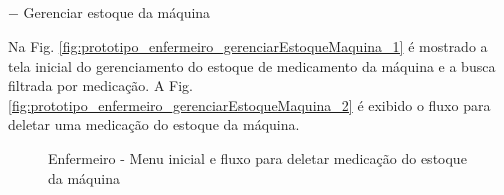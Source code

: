 \subparagraph*{} $-$ Gerenciar estoque da máquina

Na Fig. \ref{fig:prototipo_enfermeiro_gerenciarEstoqueMaquina_1} é mostrado a tela inicial do gerenciamento do estoque de medicamento da máquina e a busca filtrada por medicação. A Fig. \ref{fig:prototipo_enfermeiro_gerenciarEstoqueMaquina_2} é exibido o fluxo para deletar uma medicação do estoque da máquina.

\begin{figure}[H]
    \centering
    \caption{Enfermeiro - Menu inicial e fluxo para deletar medicação do estoque da máquina}
\end{figure}

